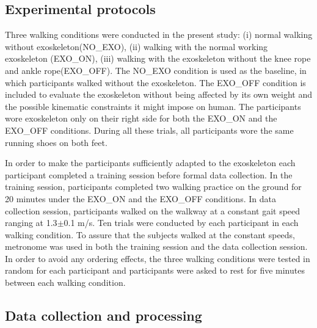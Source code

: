 \documentclass[twocolumn,cleanfoot,10pt]{asme2ej}
\begin{document}
\subsection{Experimental protocols}
Three walking conditions were conducted in the present study: (i) normal walking without exoskeleton(NO\_EXO), (ii) walking with the normal working exoskeleton (EXO\_ON), (iii) walking with the exoskeleton without the knee rope and ankle rope(EXO\_OFF). The NO\_EXO condition is used as the baseline, in which participants walked without the exoskeleton. The EXO\_OFF condition is included to evaluate the exoskeleton without being affected by its own weight and the possible kinematic constraints it might impose on human. The participants wore exoskeleton only on their right side for both the EXO\_ON and the EXO\_OFF conditions. During all these trials, all participants wore the same running shoes on both feet. 


In order to make the participants sufficiently adapted to the exoskeleton each participant completed a training session before formal data collection. In the training session, participants completed two walking practice on the ground for 20 minutes under the EXO\_ON and the EXO\_OFF conditions. In data collection session, participants walked on the walkway at a constant gait speed ranging at 1.3$\pm$0.1 m/s. Ten trials were conducted by each participant in each walking condition.	To assure that the subjects walked at the constant speeds, metronome was used in both the training session and the data collection session. In order to avoid any ordering effects, the three walking conditions were tested in random for each participant and participants were asked to rest for five minutes between each walking condition. 

\subsection{Data collection and processing}
\end{document}
